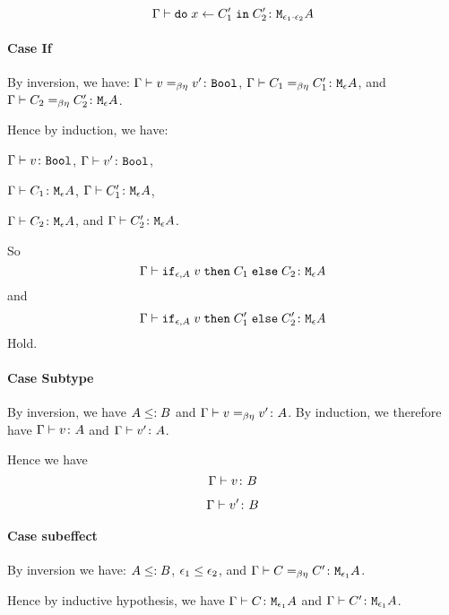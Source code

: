 {        
        \begin{equation}
            \Gamma \vdash \texttt{do}\; x \leftarrow C_1' \;\texttt{in}\; C_2' \colon \texttt{M}_{\epsilon_1\cdot\epsilon_2}{A}
        \end{equation}
    \paragraph{Case If}
    By inversion, we have:
    $\Gamma \vdash v =_{\beta\eta} v' \colon \texttt{Bool}$,
    $\Gamma \vdash C_1 =_{\beta\eta} C_1' \colon \texttt{M}_{\epsilon}{A}$, and
    $\Gamma \vdash C_2 =_{\beta\eta} C_2' \colon \texttt{M}_{\epsilon}{A}$.

    Hence by induction, we have:

    $\Gamma \vdash v \colon \texttt{Bool}$,
    $\Gamma \vdash v' \colon \texttt{Bool}$,

    $\Gamma \vdash C_1 \colon \texttt{M}_{\epsilon}{A}$,
    $\Gamma \vdash C_1' \colon \texttt{M}_{\epsilon}{A}$,

    
    $\Gamma \vdash C_2 \colon \texttt{M}_{\epsilon}{A}$, and
    $\Gamma \vdash C_2' \colon \texttt{M}_{\epsilon}{A}$.

    So 
    \begin{equation}
        \Gamma \vdash \texttt{if}_{\epsilon, A}\; v\; \texttt{then}\; C_1 \;\texttt{else} \; C_2 \colon \texttt{M}_{\epsilon}{A}
    \end{equation}
    and
    \begin{equation}
        \Gamma \vdash \texttt{if}_{\epsilon, A}\; v\; \texttt{then}\; C_1' \;\texttt{else} \; C_2' \colon \texttt{M}_{\epsilon}{A}
    \end{equation}
    Hold.
    \paragraph{Case Subtype}

    By inversion, we have $A \leq: B$ and $\Gamma \vdash v =_{\beta\eta} v' \colon A$. By induction, we therefore have $\Gamma \vdash v \colon A$ and $\Gamma \vdash v' \colon A$.

    Hence we have 
    \begin{equation}
        \Gamma \vdash v \colon B
    \end{equation}

    
    \begin{equation}
        \Gamma \vdash v' \colon B
    \end{equation}
    \paragraph{Case subeffect}

    By inversion we have: $A \leq: B$, $\epsilon_1 \leq \epsilon_2$, and $\Gamma \vdash C =_{\beta\eta} C' \colon \texttt{M}_{\epsilon_1}{A}$.

    Hence by inductive hypothesis, we have $\Gamma \vdash C \colon \texttt{M}_{\epsilon_1}{A}$ and $\Gamma \vdash C' \colon \texttt{M}_{\epsilon_1}{A}$.

}
